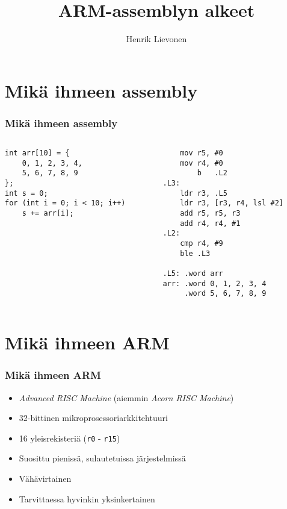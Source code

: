 \documentclass{beamer}
\author{Henrik Lievonen}
\title{ARM-assemblyn alkeet}
\begin{document}
\frame{\titlepage}


\section{Mikä ihmeen assembly}
\begin{frame}[fragile]
    \frametitle{Mikä ihmeen assembly}
    \begin{columns}[T]
        \begin{column}{.48\textwidth}
            \begin{verbatim}
int arr[10] = {
    0, 1, 2, 3, 4,
    5, 6, 7, 8, 9
};
int s = 0;
for (int i = 0; i < 10; i++)
    s += arr[i];
            \end{verbatim}
        \end{column}
        \pause
        \begin{column}{.48\textwidth}
            \begin{verbatim}
    mov r5, #0
    mov r4, #0
        b   .L2
.L3:
    ldr r3, .L5
    ldr r3, [r3, r4, lsl #2]
    add r5, r5, r3
    add r4, r4, #1
.L2:
    cmp r4, #9
    ble .L3

.L5: .word arr
arr: .word 0, 1, 2, 3, 4
     .word 5, 6, 7, 8, 9
            \end{verbatim}
        \end{column}
    \end{columns}
\end{frame}

\section{Mikä ihmeen ARM}
\begin{frame}
    \frametitle{Mikä ihmeen ARM}
    \begin{itemize}
        \item \emph{Advanced RISC Machine} (aiemmin \emph{Acorn RISC Machine})
        \item 32-bittinen mikroprosessoriarkkitehtuuri
        \item 16 yleisrekisteriä (\texttt{r0} - \texttt{r15})
        \item Suosittu pienissä, sulautetuissa järjestelmissä
        \item Vähävirtainen
        \item Tarvittaessa hyvinkin yksinkertainen

    \end{itemize}
\end{frame}
\end{document}
